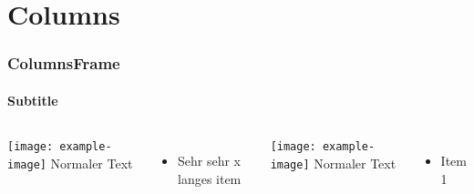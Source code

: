 \documentclass{beamer}
\begin{document}
\section{Columns}

\begin{frame}
  \frametitle{ColumnsFrame}
  \framesubtitle{Subtitle}
  \begin{columns}
    \texttt{[image: example-image]}
    Normaler Text
    \begin{itemize}
      \item<1->{Sehr sehr x langes item}
    \end{itemize}
    \texttt{[image: example-image]}
    Normaler Text
    \begin{itemize}
      \item<1->{Item 1}
    \end{itemize}
  \end{columns}
\end{frame}
\end{document}
